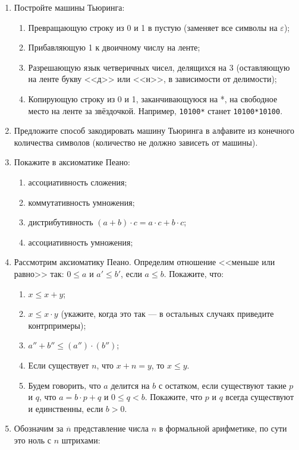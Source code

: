 \documentclass[10pt,a4paper,oneside]{article}
\begin{document}
\begin{enumerate}
\item Постройте машины Тьюринга:
\begin{enumerate}
\item Превращающую строку из 0 и 1 в пустую (заменяет все символы на $\varepsilon$);
\item Прибавляющую 1 к двоичному числу на ленте;
\item Разрешающую язык четверичных чисел, делящихся на 3 (оставляющую на ленте букву 
<<д>> или <<н>>, в зависимости от делимости);
\item Копирующую строку из 0 и 1, заканчивающуюся на *, на свободное место на ленте за 
звёздочкой. Например, \verb!10100*! станет \verb!10100*10100!.
\end{enumerate}

\item Предложите способ закодировать машину Тьюринга в алфавите из конечного количества символов
(количество не должно зависеть от машины).

\item Покажите в аксиоматике Пеано:
\begin{enumerate}
\item ассоциативность сложения;
\item коммутативность умножения;
\item дистрибутивность $(a + b) \cdot c = a \cdot c + b \cdot c$;
\item ассоциативность умножения;
\end{enumerate}

\item Рассмотрим аксиоматику Пеано. Определим отношение <<меньше или равно>> так: $0 \le a$ и $a' \le b'$, если $a \le b$. Покажите, что:
\begin{enumerate}
\item $x \le x+y$;
\item $x \le x \cdot y$ (укажите, когда это так --- в остальных случаях приведите контрпримеры);
\item $a'' + b'' \le (a'') \cdot (b'')$;
\item Если существует $n$, что $x + n  = y$, то $x \le y$.
\item Будем говорить, что $a$ делится на $b$ с остатком, если существуют такие $p$ и $q$, что 
$a = b \cdot p + q$ и $0 \le q < b$. Покажите, что $p$ и $q$ всегда существуют и единственны,
если $b > 0$.
\end{enumerate}

\item Обозначим за $\overline{n}$ представление числа $n$ в формальной арифметике, по сути это ноль с $n$ штрихами:


\end{enumerate}
\end{document}
